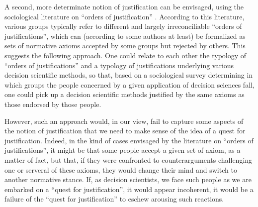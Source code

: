 \documentclass[preprint, french, english, 11pt, authoryear]{elsarticle}%
\begin{document}
A second, more determinate notion of justification can be envisaged, using the sociological literature on ``orders of justification'' \citep{boltanski_justification_2006}. According to this literature, various groups typically refer to different and largely irreconciliable ``orders of justifications'', which can (according to some authors at least) be formalized as sets of normative axioms accepted by some groups but rejected by others. This suggests the following approach. One could relate to each other the typology of ``orders of justifications'' and a typology of justifications underlying various decision scientific methods, so that, based on a sociological survey determining in which groups the people concerned by a given application of decision sciences fall, one could pick up a decision scientific methods justified by the same axioms as those endorsed by those people.

However, such an approach would, in our view, fail to capture some aspects of the notion of justification that we need to make sense of the idea of a quest for justification. Indeed, in the kind of cases envisaged by the literature on ``orders of justifications'', it might be that some people accept a given set of axiom, as a matter of fact, but that, if they were confronted to counterarguments challenging one or serveral of these axioms, they would change their mind and switch to another normative stance. If, as decision scientists, we face such people as we are embarked on a ``quest for justification'', it would appear incoherent, it would be a failure of the ``quest for justification'' to eschew arousing such reactions. 
\end{document}
